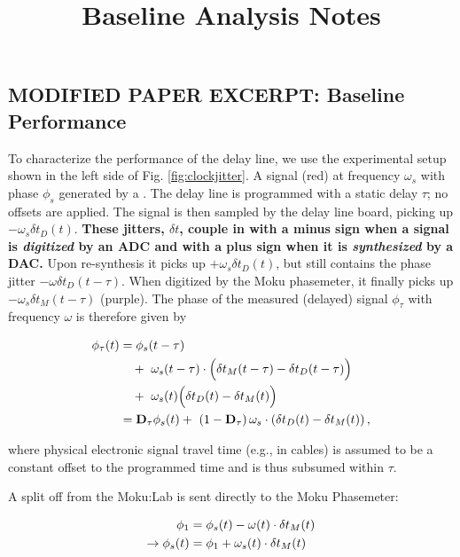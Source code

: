 \documentclass{article}
\title{Baseline Analysis Notes}
\author{}
\begin{document}
\maketitle
\subsection{\textbf{MODIFIED PAPER EXCERPT:} Baseline Performance}
\label{s:Performance}
To characterize the performance of the delay line, we use the experimental setup shown in the left side of Fig. \ref{fig:clockjitter}. A signal (red) at frequency $\omega_s$ with phase $\phi_s$ generated by a .  The delay line is programmed with a static delay $\tau$; no offsets are applied. The signal is then sampled by the delay line board, picking up $-\omega_s\delta t_D(t)$. \textbf{These jitters, $\delta t$, couple in with a minus sign when a signal is \emph{digitized} by an ADC and with a plus sign when it is \emph{synthesized} by a DAC.} Upon re-synthesis it picks up $+\omega_s\delta t_D(t)$, but still contains the phase jitter $-\omega\delta t_D(t -\tau)$. When digitized by the Moku phasemeter, it finally picks up $-\omega_s\delta t_M(t - \tau)$ (purple). The phase of the measured (delayed) signal $\phi_\tau$ with frequency $\omega$ is therefore given by

\begin{align}
    \phi_\tau(t) 
        &= \phi_s(t - \tau) \notag\\
        &\quad +\ \omega_s(t - \tau) \cdot \Big( \delta t_M(t - \tau) - \delta t_D(t - \tau) \Big) 
        \notag \\
        & 
        \quad+\ \omega_s(t) \Big( \delta t_D(t) - \delta t_M(t) \Big) 
        \notag \\
        &= \mathbf{D}_\tau\phi_s(t) 
        +\ \left(1 - \mathbf{D}_\tau\right)\omega_s \cdot\left(\delta t_D(t) - \delta t_M(t)\right),
    \label{eq:clocktrace}
\end{align}

where physical electronic signal travel time (e.g., in cables) is assumed to be a constant offset to the programmed time and is thus subsumed within $\tau$.

A split off from the Moku:Lab is sent directly to the Moku Phasemeter:

\begin{align}
  \phi_1 &= \phi_s(t) - \omega(t) \cdot \delta t_M(t) \notag \\
  \rightarrow \phi_s(t) &= \phi_1 + \omega_s(t) \cdot \delta t_M(t)
\end{align}
\end{document}
